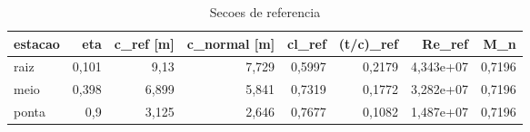 \begin{table}[htb]
\centering
\caption{Secoes de referencia}
\label{tab:secoes}
\begin{tabular}{lrrrrrrr}
\hline
estacao & eta & c\_ref [m] & c\_normal [m] & cl\_ref & (t/c)\_ref & Re\_ref & M\_n \\
\hline
raiz & 0,101 & 9,13 & 7,729 & 0,5997 & 0,2179 & 4,343e+07 & 0,7196 \\
meio & 0,398 & 6,899 & 5,841 & 0,7319 & 0,1772 & 3,282e+07 & 0,7196 \\
ponta & 0,9 & 3,125 & 2,646 & 0,7677 & 0,1082 & 1,487e+07 & 0,7196 \\
\hline
\end{tabular}
\end{table}
